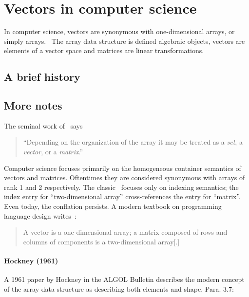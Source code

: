 \label{sec:array_history}
\section{Vectors in computer science}

In computer science, vectors are synonymous with one-dimensional arrays, or simply arrays.~\cite{Knuth1967,Pratt2001} The array data structure is
defined algebraic objects, vectors are elements of a vector space and matrices are linear transformations.

\subsection{A brief history}



\subsection{More notes}

The seminal work of~\cite{Iliffe1961} says
%
\begin{quote}
``Depending on the organization of the array it may
be treated as a \textit{set}, a \textit{vector}, or a \textit{matrix}.''
\end{quote}


Computer science focuses primarily on the homogeneous container semantics of
vectors and matrices. Oftentimes they are considered synonymous with arrays of
rank 1 and 2 respectively.
%
The classic~\cite{Knuth1967} focuses only on indexing semantics; the index
entry for ``two-dimensional array'' cross-references the entry for ``matrix''.
Even today, the conflation persists. A modern textbook on programming language
design writes~\cite[p. 215]{Pratt2001}:
%
\begin{quote}
A vector is a one-dimensional array; a matrix composed of rows and columns of
components is a two-dimensional array[.]
\end{quote}


\paragraph{Hockney (1961)~\cite{Hockney1961}}

A 1961 paper by Hockney in the ALGOL Bulletin
describes the modern concept of the array data structure as describing
both elements and shape. Para. 3.7:

